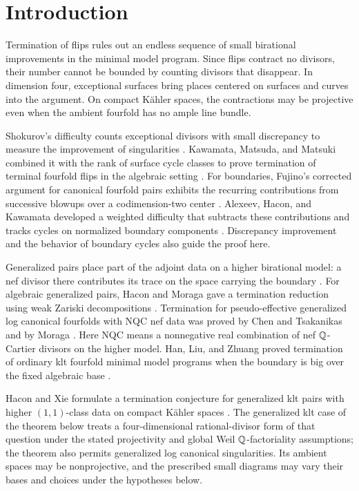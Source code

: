 \section{Introduction}\label{sec:introduction}

Termination of flips rules out an endless sequence of small birational improvements in the minimal model program. Since flips contract no divisors, their number cannot be bounded by counting divisors that disappear. In dimension four, exceptional surfaces bring places centered on surfaces and curves into the argument. On compact K\"ahler spaces, the contractions may be projective even when the ambient fourfold has no ample line bundle.

Shokurov's difficulty counts exceptional divisors with small discrepancy to measure the improvement of singularities \cite[Definition~2.15 and Corollaries~2.16--2.17]{ShokurovNonvanishing}. Kawamata, Matsuda, and Matsuki combined it with the rank of surface cycle classes to prove termination of terminal fourfold flips in the algebraic setting \cite[Theorem~5-1-15]{KawamataMatsudaMatsuki1987}. For boundaries, Fujino's corrected argument for canonical fourfold pairs exhibits the recurring contributions from successive blowups over a codimension-two center \cite[Example~2.1 and Theorems~5.1--5.2]{Fujino2005Addendum}. Alexeev, Hacon, and Kawamata developed a weighted difficulty that subtracts these contributions and tracks cycles on normalized boundary components \cite[Section~2]{AlexeevHaconKawamata2007}. Discrepancy improvement and the behavior of boundary cycles also guide the proof here.

Generalized pairs place part of the adjoint data on a higher birational model: a nef divisor there contributes its trace on the space carrying the boundary \cite[Definitions~1.4 and 4.1]{BirkarZhang2016}. For algebraic generalized pairs, Hacon and Moraga gave a termination reduction using weak Zariski decompositions \cite[Theorem~1]{HaconMoraga2020}. Termination for pseudo-effective generalized log canonical fourfolds with NQC nef data was proved by Chen and Tsakanikas \cite[Theorem~1.1]{ChenTsakanikas2023} and by Moraga \cite[Theorem~4.4]{Moraga2025}. Here NQC means a nonnegative real combination of nef \(\mathbb{Q}\)-Cartier divisors on the higher model. Han, Liu, and Zhuang proved termination of ordinary klt fourfold minimal model programs when the boundary is big over the fixed algebraic base \cite[Corollary~3.2(3)]{HanLiuZhuang2025}.

Hacon and Xie formulate a termination conjecture for generalized klt pairs with higher \((1,1)\)-class data on compact K\"ahler spaces \cite[Conjecture~1.15]{HaconXie2026}. The generalized klt case of the theorem below treats a four-dimensional rational-divisor form of that question under the stated projectivity and global Weil \(\mathbb{Q}\)-factoriality assumptions; the theorem also permits generalized log canonical singularities. Its ambient spaces may be nonprojective, and the prescribed small diagrams may vary their bases and choices under the hypotheses below.

